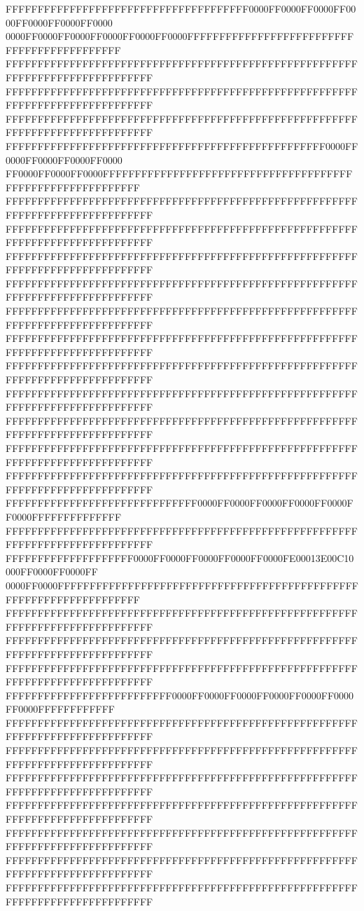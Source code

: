FFFFFFFFFFFFFFFFFFFFFFFFFFFFFFFFFFFFFF0000FF0000FF0000FF0000FF0000FF0000FF0000
0000FF0000FF0000FF0000FF0000FF0000FFFFFFFFFFFFFFFFFFFFFFFFFFFFFFFFFFFFFFFFFFFF
FFFFFFFFFFFFFFFFFFFFFFFFFFFFFFFFFFFFFFFFFFFFFFFFFFFFFFFFFFFFFFFFFFFFFFFFFFFFFF
FFFFFFFFFFFFFFFFFFFFFFFFFFFFFFFFFFFFFFFFFFFFFFFFFFFFFFFFFFFFFFFFFFFFFFFFFFFFFF
FFFFFFFFFFFFFFFFFFFFFFFFFFFFFFFFFFFFFFFFFFFFFFFFFFFFFFFFFFFFFFFFFFFFFFFFFFFFFF
FFFFFFFFFFFFFFFFFFFFFFFFFFFFFFFFFFFFFFFFFFFFFFFFFF0000FF0000FF0000FF0000FF0000
FF0000FF0000FF0000FFFFFFFFFFFFFFFFFFFFFFFFFFFFFFFFFFFFFFFFFFFFFFFFFFFFFFFFFFFF
FFFFFFFFFFFFFFFFFFFFFFFFFFFFFFFFFFFFFFFFFFFFFFFFFFFFFFFFFFFFFFFFFFFFFFFFFFFFFF
FFFFFFFFFFFFFFFFFFFFFFFFFFFFFFFFFFFFFFFFFFFFFFFFFFFFFFFFFFFFFFFFFFFFFFFFFFFFFF
FFFFFFFFFFFFFFFFFFFFFFFFFFFFFFFFFFFFFFFFFFFFFFFFFFFFFFFFFFFFFFFFFFFFFFFFFFFFFF
FFFFFFFFFFFFFFFFFFFFFFFFFFFFFFFFFFFFFFFFFFFFFFFFFFFFFFFFFFFFFFFFFFFFFFFFFFFFFF
FFFFFFFFFFFFFFFFFFFFFFFFFFFFFFFFFFFFFFFFFFFFFFFFFFFFFFFFFFFFFFFFFFFFFFFFFFFFFF
FFFFFFFFFFFFFFFFFFFFFFFFFFFFFFFFFFFFFFFFFFFFFFFFFFFFFFFFFFFFFFFFFFFFFFFFFFFFFF
FFFFFFFFFFFFFFFFFFFFFFFFFFFFFFFFFFFFFFFFFFFFFFFFFFFFFFFFFFFFFFFFFFFFFFFFFFFFFF
FFFFFFFFFFFFFFFFFFFFFFFFFFFFFFFFFFFFFFFFFFFFFFFFFFFFFFFFFFFFFFFFFFFFFFFFFFFFFF
FFFFFFFFFFFFFFFFFFFFFFFFFFFFFFFFFFFFFFFFFFFFFFFFFFFFFFFFFFFFFFFFFFFFFFFFFFFFFF
FFFFFFFFFFFFFFFFFFFFFFFFFFFFFFFFFFFFFFFFFFFFFFFFFFFFFFFFFFFFFFFFFFFFFFFFFFFFFF
FFFFFFFFFFFFFFFFFFFFFFFFFFFFFFFFFFFFFFFFFFFFFFFFFFFFFFFFFFFFFFFFFFFFFFFFFFFFFF
FFFFFFFFFFFFFFFFFFFFFFFFFFFFFF0000FF0000FF0000FF0000FF0000FF0000FFFFFFFFFFFFFF
FFFFFFFFFFFFFFFFFFFFFFFFFFFFFFFFFFFFFFFFFFFFFFFFFFFFFFFFFFFFFFFFFFFFFFFFFFFFFF
FFFFFFFFFFFFFFFFFFFF0000FF0000FF0000FF0000FF0000FE00013E00C10000FF0000FF0000FF
0000FF0000FFFFFFFFFFFFFFFFFFFFFFFFFFFFFFFFFFFFFFFFFFFFFFFFFFFFFFFFFFFFFFFFFFFF
FFFFFFFFFFFFFFFFFFFFFFFFFFFFFFFFFFFFFFFFFFFFFFFFFFFFFFFFFFFFFFFFFFFFFFFFFFFFFF
FFFFFFFFFFFFFFFFFFFFFFFFFFFFFFFFFFFFFFFFFFFFFFFFFFFFFFFFFFFFFFFFFFFFFFFFFFFFFF
FFFFFFFFFFFFFFFFFFFFFFFFFFFFFFFFFFFFFFFFFFFFFFFFFFFFFFFFFFFFFFFFFFFFFFFFFFFFFF
FFFFFFFFFFFFFFFFFFFFFFFFFF0000FF0000FF0000FF0000FF0000FF0000FF0000FFFFFFFFFFFF
FFFFFFFFFFFFFFFFFFFFFFFFFFFFFFFFFFFFFFFFFFFFFFFFFFFFFFFFFFFFFFFFFFFFFFFFFFFFFF
FFFFFFFFFFFFFFFFFFFFFFFFFFFFFFFFFFFFFFFFFFFFFFFFFFFFFFFFFFFFFFFFFFFFFFFFFFFFFF
FFFFFFFFFFFFFFFFFFFFFFFFFFFFFFFFFFFFFFFFFFFFFFFFFFFFFFFFFFFFFFFFFFFFFFFFFFFFFF
FFFFFFFFFFFFFFFFFFFFFFFFFFFFFFFFFFFFFFFFFFFFFFFFFFFFFFFFFFFFFFFFFFFFFFFFFFFFFF
FFFFFFFFFFFFFFFFFFFFFFFFFFFFFFFFFFFFFFFFFFFFFFFFFFFFFFFFFFFFFFFFFFFFFFFFFFFFFF
FFFFFFFFFFFFFFFFFFFFFFFFFFFFFFFFFFFFFFFFFFFFFFFFFFFFFFFFFFFFFFFFFFFFFFFFFFFFFF
FFFFFFFFFFFFFFFFFFFFFFFFFFFFFFFFFFFFFFFFFFFFFFFFFFFFFFFFFFFFFFFFFFFFFFFFFFFFFF
